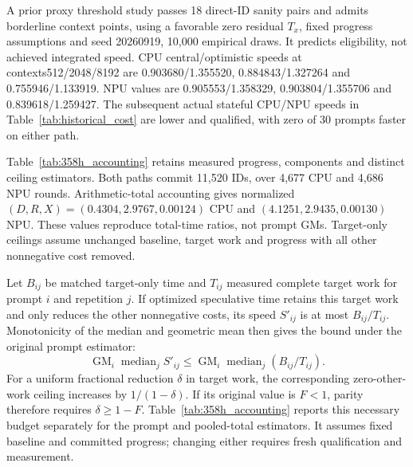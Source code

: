 A prior proxy threshold study passes 18 direct-ID sanity pairs and admits borderline context points, using a favorable zero residual $T_x$, fixed progress assumptions and seed 20260919, 10,000 empirical draws. It predicts eligibility, not achieved integrated speed. CPU central/optimistic speeds at contexts512/2048/8192 are 0.903680/1.355520, 0.884843/1.327264 and 0.755946/1.133919. NPU values are 0.905553/1.358329, 0.903804/1.355706 and 0.839618/1.259427. The subsequent actual stateful CPU/NPU speeds in Table~\ref{tab:historical_cost} are lower and qualified, with zero of 30 prompts faster on either path.

Table~\ref{tab:358h_accounting} retains measured progress, components and distinct ceiling estimators. Both paths commit 11,520 IDs, over 4,677 CPU and 4,686 NPU rounds. Arithmetic-total accounting gives normalized $(D,R,X)=(0.4304,2.9767,0.00124)$ CPU and $(4.1251,2.9435,0.00130)$ NPU. These values reproduce total-time ratios, not prompt GMs. Target-only ceilings assume unchanged baseline, target work and progress with all other nonnegative cost removed.

Let $B_{ij}$ be matched target-only time and $T_{ij}$ measured complete target work for prompt $i$ and repetition $j$. If optimized speculative time retains this target work and only reduces the other nonnegative costs, its speed $S'_{ij}$ is at most $B_{ij}/T_{ij}$. Monotonicity of the median and geometric mean then gives the bound under the original prompt estimator:
\begin{equation}
\operatorname{GM}_{i}\operatorname{median}_{j} S'_{ij}
\leq \operatorname{GM}_{i}\operatorname{median}_{j}(B_{ij}/T_{ij}).
\label{eq:floor}
\end{equation}
For a uniform fractional reduction $\delta$ in target work, the corresponding zero-other-work ceiling increases by $1/(1-\delta)$. If its original value is $F<1$, parity therefore requires $\delta\geq 1-F$. Table~\ref{tab:358h_accounting} reports this necessary budget separately for the prompt and pooled-total estimators. It assumes fixed baseline and committed progress; changing either requires fresh qualification and measurement.


